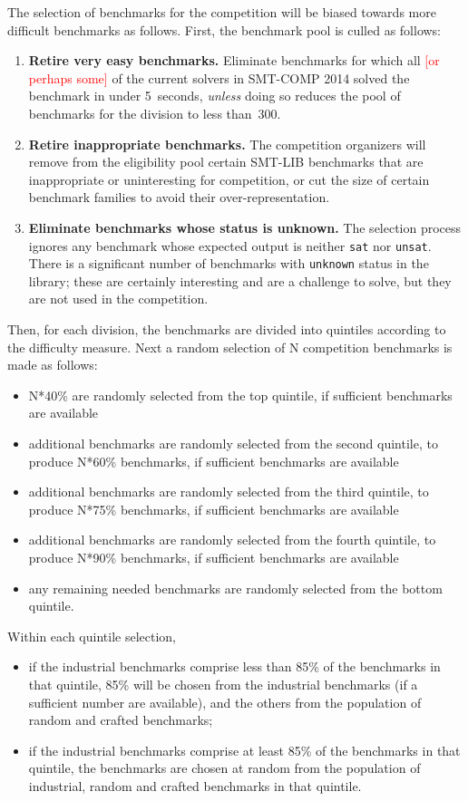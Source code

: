 \documentclass[12pt]{article}
\newcommand{\remark}[1]{{\small\textcolor{red}{[#1]}}}
\begin{document}
The selection of benchmarks for the competition will be biased towards more difficult benchmarks
as follows. First, the benchmark pool is culled as follows:
\begin{enumerate}

\item \textbf{Retire very easy benchmarks.}
%
Eliminate benchmarks for which all \remark{or perhaps some} of the
current solvers in SMT-COMP 2014 solved the benchmark in under
5~seconds, \emph{unless} doing so reduces the pool of benchmarks for
the division to less than~300.

\item \textbf{Retire inappropriate benchmarks.}
%
The competition organizers will remove from the eligibility pool
certain SMT-LIB benchmarks that are inappropriate or uninteresting for
competition, or cut the size of certain benchmark families to avoid
their over-representation.

\item \textbf{Eliminate benchmarks whose status is unknown.}
%
The selection process ignores any benchmark whose expected output is
neither {\tt sat} nor {\tt unsat}.  There is a significant number of
benchmarks with {\tt unknown} status in the library; these are
certainly interesting and are a challenge to solve, but they are not
used in the competition.

\end{enumerate}

Then, for each division, the benchmarks are divided into quintiles according to the difficulty measure.
Next a random selection of N competition benchmarks is made as follows:
\begin{itemize}
\item N*40\% are randomly selected from the top quintile, if sufficient benchmarks are available
\item additional benchmarks are randomly selected from the second quintile, to produce N*60\% benchmarks, if sufficient benchmarks are available
\item additional benchmarks are randomly selected from the third quintile, to produce N*75\% benchmarks, if sufficient benchmarks are available
\item additional benchmarks are randomly selected from the fourth quintile, to produce N*90\% benchmarks, if sufficient benchmarks are available
\item any remaining needed benchmarks are randomly selected from the bottom quintile.
\end{itemize}
Within each quintile selection,
\begin{itemize}
\item if the industrial benchmarks comprise less than 85\% of the benchmarks in that quintile, 85\% will be chosen from the industrial benchmarks (if a sufficient number are available), and the others from the population of random and crafted benchmarks;
\item if the industrial benchmarks comprise at least 85\% of the benchmarks in that quintile, the benchmarks are chosen at random from the population of industrial, random and crafted benchmarks in that quintile.
\end{itemize}
\end{document}
